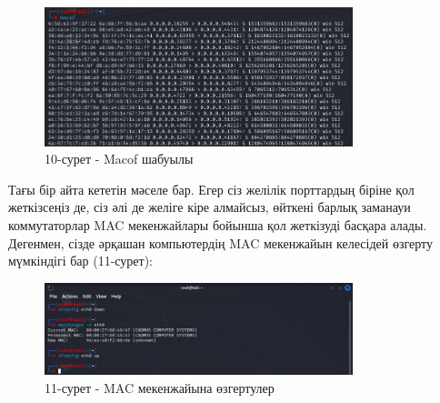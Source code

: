 \begin{figure}[H]
	\centering
	\includegraphics[width=0.8\textwidth]{assets/34}
	\caption*{10-сурет - Macof шабуылы}
\end{figure}

\begin{multicols}{2}
Тағы бір айта кететін мәселе бар. Егер сіз желілік порттардың біріне қол
жеткізсеңіз де, сіз әлі де желіге кіре алмайсыз, өйткені барлық заманауи
коммутаторлар MAC мекенжайлары бойынша қол жеткізуді басқара алады.
Дегенмен, сізде әрқашан компьютердің MAC мекенжайын келесідей өзгерту
мүмкіндігі бар (11-сурет):
\end{multicols}

\begin{figure}[H]
	\centering
	\includegraphics[width=0.8\textwidth]{assets/35}
	\caption*{11-сурет - MAC мекенжайына өзгертулер}
\end{figure}

